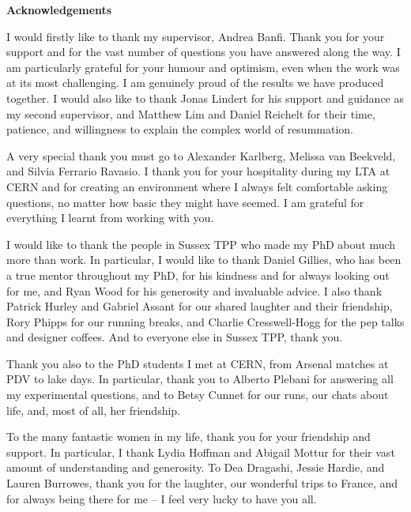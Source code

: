 \pagestyle{empty}%
\begin{center}
\Huge \textbf{Acknowledgements}
\hrulefill
\end{center}

I would firstly like to thank my supervisor, Andrea Banfi. Thank you for your support and for the vast number of questions you have answered along the way. I am particularly grateful for your humour and optimism, even when the work was at its most challenging. I am genuinely proud of the results we have produced together. I would also like to thank Jonas Lindert for his support and guidance as my second supervisor, and Matthew Lim and Daniel Reichelt for their time, patience, and willingness to explain the complex world of resummation.

A very special thank you must go to Alexander Karlberg, Melissa van Beekveld, and Silvia Ferrario Ravasio. I thank you for your hospitality during my LTA at CERN and for creating an environment where I always felt comfortable asking questions, no matter how basic they might have seemed. I am grateful for everything I learnt from working with you.

I would like to thank the people in Sussex TPP who made my PhD about much more than work. In particular, I would like to thank Daniel Gillies, who has been a true mentor throughout my PhD, for his kindness and for always looking out for me, and Ryan Wood for his generosity and invaluable advice. I also thank Patrick Hurley and Gabriel Assant for our shared laughter and their friendship, Rory Phipps for our running breaks, and Charlie Cresswell-Hogg for the pep talks and designer coffees. And to everyone else in Sussex TPP, thank you.

Thank you also to the PhD students I met at CERN, from Arsenal matches at PDV to lake days. In particular, thank you to Alberto Plebani for answering all my experimental questions, and to Betsy Cunnet for our runs, our chats about life, and, most of all, her friendship.

To the many fantastic women in my life, thank you for your friendship and support. In particular, I thank Lydia Hoffman and Abigail Mottur for their vast amount of understanding and generosity. To Dea Dragashi, Jessie Hardie, and Lauren Burrowes, thank you for the laughter, our wonderful trips to France, and for always being there for me -- I feel very lucky to have you all.

